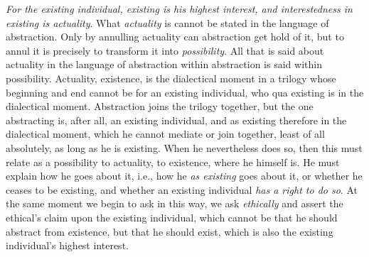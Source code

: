 \documentclass[12pt,a4paper,openany]{book}
\newcommand{\kpage}[1]{\marginnote{\footnotesize\textit{[#1]}}}
\begin{document}
\emph{For the existing individual, existing is his highest interest, and interestedness
in existing is actuality}. What \emph{actuality} is cannot be stated in
the language of abstraction. Only by annulling actuality can abstraction
get hold of it, but to annul it is precisely to transform
it into \emph{possibility}. All that is said about actuality in the language of abstraction within
abstraction is said within possibility.
Actuality, existence, is the dialectical moment in a trilogy
whose beginning and end cannot be for an existing individual, who
qua existing is in the dialectical moment. Abstraction joins
the trilogy together, but the one abstracting is, after all, an existing individual, and
as existing therefore in the dialectical moment, which he cannot
mediate or join together, least of all absolutely, as long as
he is existing. When he nevertheless does so, then this must relate
as a possibility to actuality, to existence, where he himself is.
He must explain how he goes about it, i.e., how he
\emph{as existing} goes about it, or whether he ceases to be
existing, and whether an existing individual \emph{has a right to do so}. At the same moment we
begin to ask in this way, we ask \emph{ethically} and assert the ethical's
claim upon the existing individual, which cannot be that he should abstract\kpage{123}
from existence, but that he should exist, which is also the
existing individual's highest interest.
\end{document}

